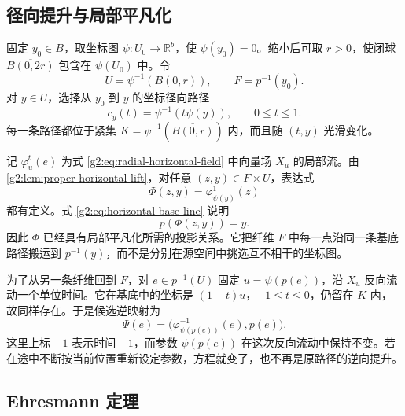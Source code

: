 \subsection{径向提升与局部平凡化}
\label{g2:subsec:1506:03}

固定 \(y_0\in B\)，取坐标图 \(\psi:U_0\to\mathbb R^b\)，使 \(\psi(y_0)=0\)。缩小后可取 \(r>0\)，使闭球 \(\overline{B(0,2r)}\) 包含在 \(\psi(U_0)\) 中。令
\[
	U=\psi^{-1}(B(0,r)),\qquad F=p^{-1}(y_0).
\]
对 \(y\in U\)，选择从 \(y_0\) 到 \(y\) 的坐标径向路径
\[
	c_y(t)=\psi^{-1}(t\psi(y)),\qquad 0\leq t\leq1.
\]
每一条路径都位于紧集 \(K=\psi^{-1}(\overline{B(0,r)})\) 内，而且随 \((t,y)\) 光滑变化。

记 \(\varphi_u^t(e)\) 为式 \eqref{g2:eq:radial-horizontal-field} 中向量场 \(X_u\) 的局部流。由 \cref{g2:lem:proper-horizontal-lift}，对任意 \((z,y)\in F\times U\)，表达式
\begin{equation}\label{g2:eq:ehresmann-trivialization}
	\Phi(z,y)=\varphi_{\psi(y)}^1(z)
\end{equation}
都有定义。式 \eqref{g2:eq:horizontal-base-line} 说明
\[
	p(\Phi(z,y))=y.
\]
因此 \(\Phi\) 已经具有局部平凡化所需的投影关系。它把纤维 \(F\) 中每一点沿同一条基底路径搬运到 \(p^{-1}(y)\)，而不是分别在源空间中挑选互不相干的坐标图。

为了从另一条纤维回到 \(F\)，对 \(e\in p^{-1}(U)\) 固定 \(u=\psi(p(e))\)，沿 \(X_u\) 反向流动一个单位时间。它在基底中的坐标是 \((1+t)u\)，\(-1\leq t\leq0\)，仍留在 \(K\) 内，故同样存在。于是候选逆映射为
\begin{equation}\label{g2:eq:ehresmann-inverse}
	\Psi(e)=\bigl(\varphi_{\psi(p(e))}^{-1}(e),p(e)\bigr).
\end{equation}
这里上标 \(-1\) 表示时间 \(-1\)，而参数 \(\psi(p(e))\) 在这次反向流动中保持不变。若在途中不断按当前位置重新设定参数，方程就变了，也不再是原路径的逆向提升。

\subsection{Ehresmann 定理}
\label{g2:subsec:1506:04}

